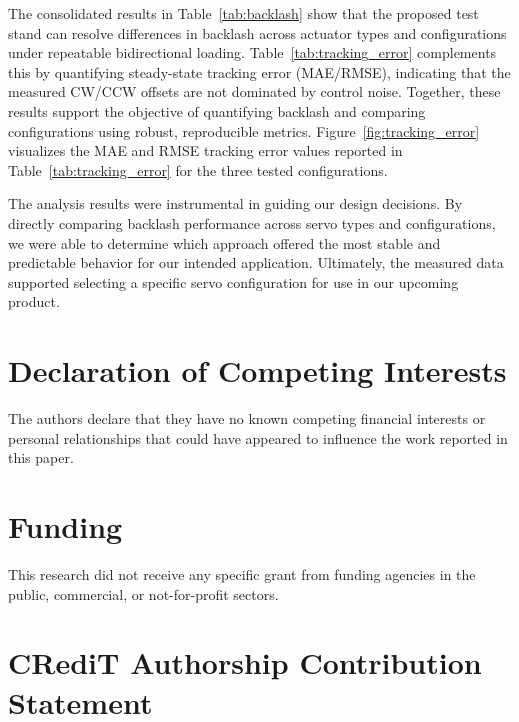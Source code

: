 \documentclass[11pt,letterpaper]{article}
\begin{document}
\FloatBarrier

The consolidated results in Table~\ref{tab:backlash} show that the proposed test stand can resolve differences in backlash across actuator types and configurations under repeatable bidirectional loading. Table~\ref{tab:tracking_error} complements this by quantifying steady-state tracking error (MAE/RMSE), indicating that the measured CW/CCW offsets are not dominated by control noise. Together, these results support the objective of quantifying backlash and comparing configurations using robust, reproducible metrics.
Figure~\ref{fig:tracking_error} visualizes the MAE and RMSE tracking error values reported in Table~\ref{tab:tracking_error} for the three tested configurations.

The analysis results were instrumental in guiding our design decisions. By directly comparing backlash performance across servo types and configurations, we were able to determine which approach offered the most stable and predictable behavior for our intended application. Ultimately, the measured data supported selecting a specific servo configuration for use in our upcoming product.

\section*{Declaration of Competing Interests}

The authors declare that they have no known competing financial interests or personal relationships that could have appeared to influence the work reported in this paper.

\section*{Funding}

This research did not receive any specific grant from funding agencies in the public, commercial, or not-for-profit sectors.

\section*{CRediT Authorship Contribution Statement}
\end{document}
